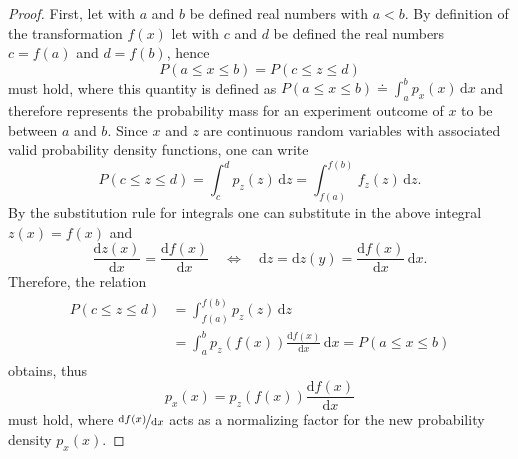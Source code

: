 \documentclass[a4paper,11pt]{report}
\def\lk#1{{\color{black}{#1}}}
\begin{document}
\begin{proof}
	First, let with $a$ and $b$ be defined real numbers with $a<b$. By definition of the transformation $f(x)$ let with $c$ and $d$ be defined the real numbers $c = f(a)$ and $d=f(b)$, hence \begin{equation}
		P(a \leq x \leq b) = P(c \leq z \leq d)
	\end{equation} must hold, where this quantity is defined as $P(a \leq x \leq b) \doteq \int_a^b p_x(x)\,\mathrm{d}x$ and therefore represents the probability mass for an experiment outcome of $x$ to be between $a$ and $b$. Since $x$ and $z$ are continuous random variables with associated valid probability density functions, one can write \begin{equation}
		P(c \leq z \leq d) = \int_c^d p_z(z)\,\mathrm{d}z = \int_{f(a)}^{f(b)}f_z(z)\,\mathrm{d}z.
	\end{equation} By the substitution rule for integrals one can substitute in the above integral $z(x) = f(x)$ and \lk{hence derives} \begin{equation}
		\frac{\mathrm{d}z(x)}{\mathrm{d}x} = \frac{\mathrm{d}f(x)}{\mathrm{d}x} \quad \Leftrightarrow \quad \mathrm{d}z=\mathrm{d}z(y) = \frac{\mathrm{d}f(x)}{\mathrm{d}x}\,\mathrm{d}x.
	\end{equation} Therefore, the relation \begin{align}\begin{aligned}
			P(c \leq z \leq d) &= \int_{f(a)}^{f(b)}p_z(z)\,\mathrm{d}z \\ &= \int_{a}^{b}p_z(f(x))\frac{\mathrm{d}f(x)}{\mathrm{d}x}\,\mathrm{d}x = P(a \leq x \leq b)
	\end{aligned}\end{align} obtains, thus
	\begin{equation}
		p_x(x) = p_z(f(x))\frac{\mathrm{d}f(x)}{\mathrm{d}x}
	\end{equation}
	must hold, where $\nicefrac{\mathrm{d}f(x)}{\mathrm{d}x}$ acts as a normalizing factor for the new probability density $p_x(x)$.
\end{proof}
\end{document}
